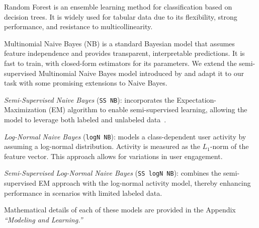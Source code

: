 Random Forest is an ensemble learning method for classification based on decision trees.
It is widely used for tabular data due to its flexibility, strong performance, and resistance to multicollinearity.

Multinomial Naive Bayes (NB) is a standard Bayesian model that assumes feature independence and provides transparent, interpretable predictions.
It is fast to train, with closed-form estimators for its parameters.
We extend the semi-supervised Multinomial Naive Bayes model introduced by \citet{nigam2000text} and adapt it to our task with some promising extensions to Naive Bayes.

\emph{Semi-Supervised Naive Bayes} (\texttt{SS NB}):
incorporates the Expectation-Maximization (EM) algorithm to enable semi-supervised learning, allowing the model to leverage both labeled and unlabeled data~\cite{sristy2012semi}.

\emph{Log-Normal Naive Bayes} (\texttt{logN NB}):
models a class-dependent user activity by assuming a log-normal distribution.
Activity is measured as the $L_1$-norm of the feature vector.
This approach allows for variations in user engagement.

\emph{Semi-Supervised Log-Normal Naive Bayes} (\texttt{SS logN NB}): combines the semi-supervised EM approach with the log-normal activity model, thereby enhancing performance in scenarios with limited labeled data.

Mathematical details of each of these models are provided in the Appendix \emph{``Modeling and Learning.''}
